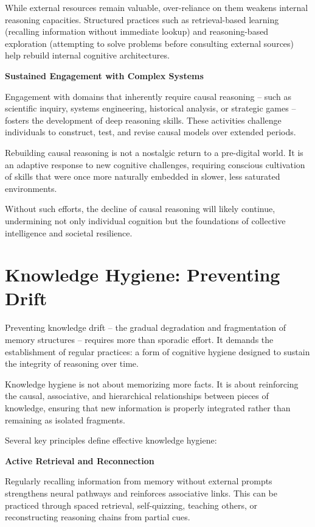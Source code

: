 While external resources remain valuable, over-reliance on them weakens
internal reasoning capacities. Structured practices such as
retrieval-based learning (recalling information without immediate
lookup) and reasoning-based exploration (attempting to solve problems
before consulting external sources) help rebuild internal cognitive
architectures.

\textbf{Sustained Engagement with Complex Systems}

Engagement with domains that inherently require causal reasoning -- such
as scientific inquiry, systems engineering, historical analysis, or
strategic games -- fosters the development of deep reasoning skills.
These activities challenge individuals to construct, test, and revise
causal models over extended periods.

Rebuilding causal reasoning is not a nostalgic return to a pre-digital
world. It is an adaptive response to new cognitive challenges, requiring
conscious cultivation of skills that were once more naturally embedded
in slower, less saturated environments.

Without such efforts, the decline of causal reasoning will likely
continue, undermining not only individual cognition but the foundations
of collective intelligence and societal resilience.



\section{Knowledge Hygiene: Preventing Drift}

Preventing knowledge drift -- the gradual degradation and fragmentation
of memory structures -- requires more than sporadic effort. It demands
the establishment of regular practices: a form of cognitive hygiene
designed to sustain the integrity of reasoning over time.

Knowledge hygiene is not about memorizing more facts. It is about
reinforcing the causal, associative, and hierarchical relationships
between pieces of knowledge, ensuring that new information is properly
integrated rather than remaining as isolated fragments.

Several key principles define effective knowledge hygiene:

\textbf{Active Retrieval and Reconnection}

Regularly recalling information from memory without external prompts
strengthens neural pathways and reinforces associative links. This can
be practiced through spaced retrieval, self-quizzing, teaching others,
or reconstructing reasoning chains from partial cues.

